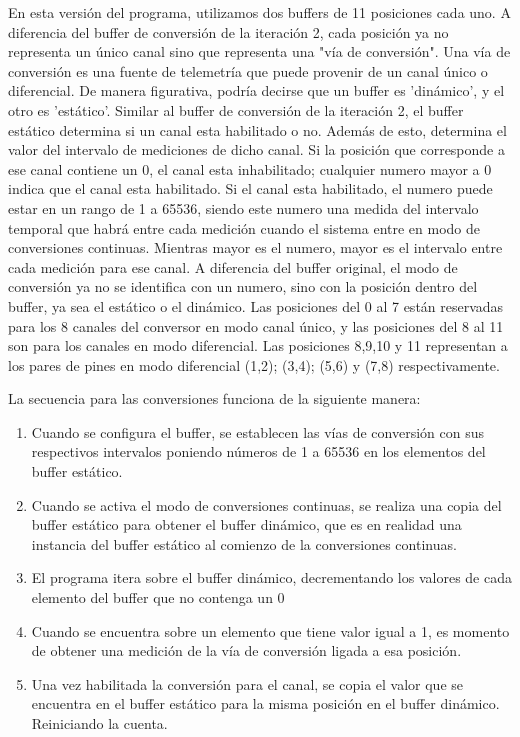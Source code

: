En esta versión del programa, utilizamos dos buffers de 11 posiciones cada uno. A diferencia del buffer de conversión de la iteración 2, cada posición ya no representa un único canal sino que representa una "vía de conversión". Una vía de conversión es una fuente de telemetría que puede provenir de un canal único o diferencial.
De manera figurativa, podría decirse que un buffer es 'dinámico', y el otro es 'estático'. Similar al buffer de conversión de la iteración 2, el buffer estático determina si un canal esta habilitado o no. Además de esto, determina el valor del intervalo de mediciones de dicho canal. Si la posición que corresponde a ese canal contiene un 0, el canal esta inhabilitado; cualquier numero mayor a 0 indica que el canal esta habilitado. Si el canal esta habilitado, el numero puede estar en un rango de 1 a 65536, siendo este numero una medida del intervalo temporal que habrá entre cada medición cuando el sistema entre en modo de conversiones continuas. Mientras mayor es el numero, mayor es el intervalo entre cada medición para ese canal.
A diferencia del buffer original, el modo de conversión ya no se identifica con un numero, sino con la posición dentro del buffer, ya sea el estático o el dinámico. Las posiciones del 0 al 7 están reservadas para los 8 canales del conversor en modo canal único, y las posiciones del 8 al 11 son para los canales en modo diferencial. Las posiciones 8,9,10 y 11 representan a los pares de pines en modo diferencial (1,2); (3,4); (5,6) y (7,8) respectivamente. 


La secuencia para las conversiones funciona de la siguiente manera:

\begin{enumerate}
\item Cuando se configura el buffer, se establecen las vías de conversión con sus respectivos intervalos poniendo números de 1 a 65536 en los elementos del buffer estático.
\item Cuando se activa el modo de conversiones continuas, se realiza una copia del buffer estático para obtener el buffer dinámico, que es en realidad una instancia del buffer estático al comienzo de la conversiones continuas.
\item El programa itera sobre el buffer dinámico, decrementando los valores de cada elemento del buffer que no contenga un 0
\item Cuando se encuentra sobre un elemento que tiene valor igual a 1, es momento de obtener una medición de la vía de conversión ligada a esa posición.
\item Una vez habilitada la conversión para el canal, se copia el valor que se encuentra en el buffer estático para la misma posición en el buffer dinámico. Reiniciando la cuenta.
\end{enumerate}

